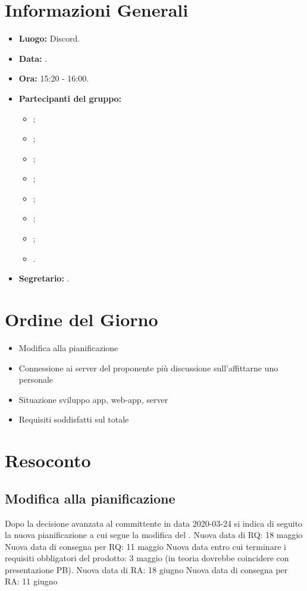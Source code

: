 \section{Informazioni Generali}
\begin{itemize}
\item \textbf{Luogo:} Discord.
\item \textbf{Data:} \Data.
\item \textbf{Ora:} 15:20 - 16:00.
\item \textbf{Partecipanti del gruppo:}
	\begin{itemize}
		\item \AT{}; 
		\item \BR{};
		\item \CE{}; 
		\item \DF{};
		\item \LD{};
		\item \MC{};
		\item \PF{};
		\item \SE{}.
	\end{itemize} 
\item \textbf{Segretario:} \AT{}.
\end{itemize}

\section{Ordine del Giorno}
\begin{itemize}
	\item Modifica alla pianificazione
	\item Connessione ai server del proponente più discussione sull'affittarne uno personale
	\item Situazione sviluppo app, web-app, server
	\item Requisiti soddisfatti sul totale
\end{itemize}

\section{Resoconto}

\subsection{Modifica alla pianificazione}
Dopo la decisione avanzata al committente in data 2020-03-24 si indica di seguito la nuova pianificazione a cui segue la modifica del \PdP{}.
Nuova data di RQ: 18 maggio
Nuova data di consegna per RQ: 11 maggio
Nuova data entro cui terminare i requisiti obbligatori del prodotto: 3 maggio (in teoria dovrebbe coincidere con presentazione PB).
Nuova data di RA: 18 giugno
Nuova data di consegna per RA: 11 giugno

